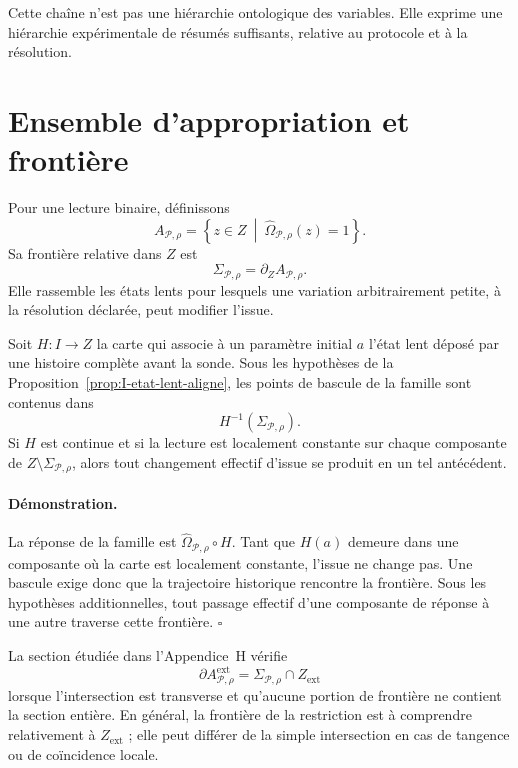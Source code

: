 Cette chaîne n'est pas une hiérarchie ontologique des variables. Elle
exprime une hiérarchie expérimentale de résumés suffisants, relative au
protocole et à la résolution.

\section{Ensemble d'appropriation et frontière}
\label{annexe-I-frontiere}

Pour une lecture binaire, définissons
\[
A_{\mathcal P,\rho}
=
\left\{
z\in Z
\ \middle|\
\widehat\Omega_{\mathcal P,\rho}(z)=1
\right\}.
\]
Sa frontière relative dans $Z$ est
\begin{equation}
\label{eq:annexe-I-Sigma}
\Sigma_{\mathcal P,\rho}
=
\partial_Z A_{\mathcal P,\rho}.
\end{equation}
Elle rassemble les états lents pour lesquels une variation arbitrairement
petite, à la résolution déclarée, peut modifier l'issue.

\begin{encadre}[title={Corollaire \theproposition{} --- Localisation des bascules d'une famille historique}]
Soit $H:I\to Z$ la carte qui associe à un paramètre initial $a$ l'état
lent déposé par une histoire complète avant la sonde. Sous les
hypothèses de la Proposition~\ref{prop:I-etat-lent-aligne}, les points de bascule de la famille
sont contenus dans
\[
H^{-1}(\Sigma_{\mathcal P,\rho}).
\]
Si $H$ est continue et si la lecture est localement constante sur chaque
composante de $Z\setminus\Sigma_{\mathcal P,\rho}$, alors tout changement effectif d'issue se produit en un tel antécédent.
\end{encadre}

\paragraph{Démonstration.}
La réponse de la famille est
$\widehat\Omega_{\mathcal P,\rho}\circ H$. Tant que $H(a)$ demeure dans
une composante où la carte est localement constante, l'issue ne change
pas. Une bascule exige donc que la trajectoire historique rencontre la
frontière. Sous les hypothèses additionnelles, tout passage effectif
d'une composante de réponse à une autre traverse cette frontière.
\hfill$\square$

La section étudiée dans l'Appendice~H vérifie
\[
\partial A^{\mathrm{ext}}_{\mathcal P,\rho}
=
\Sigma_{\mathcal P,\rho}
\cap Z_{\mathrm{ext}}
\]
lorsque l'intersection est transverse et qu'aucune portion de frontière
ne contient la section entière. En général, la frontière de la
restriction est à comprendre relativement à $Z_{\mathrm{ext}}$ ; elle
peut différer de la simple intersection en cas de tangence ou de
coïncidence locale.

